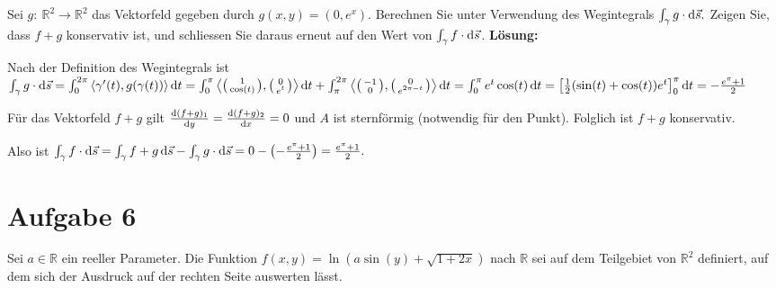 \documentclass[a4paper,10pt]{article}
\def\R{\mathbb{R}}
\begin{document}
Sei \( g: \: \R^2 \to \R^2 \) das Vektorfeld gegeben durch \( g(x, y) = (0, e^x) \). Berechnen Sie unter Verwendung des Wegintegrals
\(
    \int_\gamma g \cdot \odif{\vec{s}} \text{.}
\)
Zeigen Sie, dass \( f + g \) konservativ ist, und schliessen Sie daraus erneut auf den Wert von \( \int_\gamma f \cdot \odif{\vec{s}} \).
\textbf{Lösung:}
\begin{enumerate*}
    \item Nach der Definition des Wegintegrals ist
    \(
        \int_\gamma g \cdot \odif{\vec{s}} = \int_0^{2\pi} \left\langle \gamma'(t), g(\gamma(t)) \right\rangle \odif{t} = \int_0^\pi \left\langle \begin{psmallmatrix} 1 \\ \cos(t) \end{psmallmatrix}, \begin{psmallmatrix} 0 \\ e^t \end{psmallmatrix} \right\rangle \odif{t} + \int_\pi^{2\pi} \left\langle \begin{psmallmatrix} -1 \\ 0 \end{psmallmatrix}, \begin{psmallmatrix} 0 \\ e^{2\pi - t} \end{psmallmatrix} \right\rangle \odif{t} = \int_0^\pi e^t \cos(t) \odif{t} = \left[ \frac{1}{2}(\sin(t) + \cos(t)) e^t \right]_0^\pi \odif{t} = -\frac{e^\pi + 1}{2}
    \)
    \item Für das Vektorfeld \( f + g \) gilt
    \(
        \odv{(f+g)_1}{y} = \odv{(f + g)_2}{x} = 0
    \)
    und \( A \) ist sternförmig (notwendig für den Punkt). Folglich ist \( f + g \) konservativ.
    \item Also ist
    \(
        \int_\gamma f \cdot \odif{\vec{s}} = \int_\gamma f + g \odif{\vec{s}} - \int_\gamma g \cdot \odif{\vec{s}} = 0 - \left( - \frac{e^\pi + 1}{2} \right) = \frac{e^\pi + 1}{2} \text{.}
    \)
\end{enumerate*}


\section{Aufgabe 6}

Sei \( a \in \R \) ein reeller Parameter. Die Funktion
\(
    f(x, y) = \ln \left(a \sin(y) + \sqrt{1 + 2x} \right)
\)
nach \( \R \) sei auf dem Teilgebiet von \( \R^2 \) definiert, auf dem sich der Ausdruck auf der rechten Seite auswerten lässt.
\end{document}
